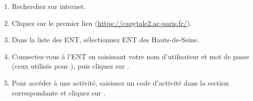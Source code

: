 
\emptyBackground


\begin{enumerate}
    \item Recherchez \Capytale{} sur internet.
    \item Cliquez sur le premier lien (\href{https://capytale2.ac-paris.fr/}{https://capytale2.ac-paris.fr/}).
    \item Dans la liste des ENT, sélectionnez \ENC ENT des Hauts-de-Seine.
    \item Connectez-vous à l'ENT en saisissant votre nom d'utilisateur et mot de passe (ceux utilisés pour \Pronote),
    puis cliquez sur .
    \item Pour accéder à une activité,
    saisissez un code d'activité dans la section correspondante et cliquez sur
    .
\end{enumerate}